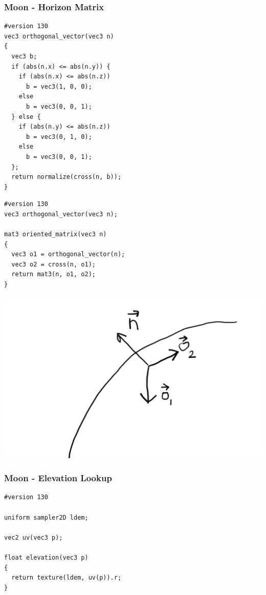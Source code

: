\documentclass[aspectratio=169,11pt,xcolor=dvipsnames]{beamer}
\begin{document}
\begin{frame}[fragile]
  \frametitle{Moon {-} Horizon Matrix}
  \begin{minipage}[t]{.48\textwidth}
    \begin{verbatim}
#version 130
vec3 orthogonal_vector(vec3 n)
{
  vec3 b;
  if (abs(n.x) <= abs(n.y)) {
    if (abs(n.x) <= abs(n.z))
      b = vec3(1, 0, 0);
    else
      b = vec3(0, 0, 1);
  } else {
    if (abs(n.y) <= abs(n.z))
      b = vec3(0, 1, 0);
    else
      b = vec3(0, 0, 1);
  };
  return normalize(cross(n, b));
}
    \end{verbatim}
  \end{minipage}
  \begin{minipage}[t]{.48\textwidth}
    \begin{verbatim}
#version 130
vec3 orthogonal_vector(vec3 n);

mat3 oriented_matrix(vec3 n)
{
  vec3 o1 = orthogonal_vector(n);
  vec3 o2 = cross(n, o1);
  return mat3(n, o1, o2);
}
    \end{verbatim}
    \begin{center}
      \includegraphics[width=.6\textwidth]{horizon}
    \end{center}
  \end{minipage}
\end{frame}

\begin{frame}[fragile]
  \frametitle{Moon {-} Elevation Lookup}
  \begin{verbatim}
#version 130

uniform sampler2D ldem;

vec2 uv(vec3 p);

float elevation(vec3 p)
{
  return texture(ldem, uv(p)).r;
}
  \end{verbatim}
\end{frame}
\end{document}
